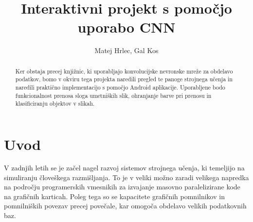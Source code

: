 \documentclass[runningheads,a4paper]{llncs}
\newcommand{\keywords}[1]{\par\addvspace\baselineskip
\noindent\keywordname\enspace\ignorespaces#1}
\begin{document}
\mainmatter  %

\title{Interaktivni projekt s pomočjo uporabo CNN}


%
%
\author{Matej Hrlec, Gal Kos}
%


%
%

\maketitle


\begin{abstract}
Ker obstaja precej knjižnic, ki uporabljajo konvolucijske nevronske mreže za obdelavo podatkov, bomo v okviru tega projekta naredili pregled te panoge strojnega učenja in naredili praktično implementacijo s pomočjo Android aplikacije. Uporabljene bodo funkcionalnost prenosa sloga umetniških slik, ohranjanje barve pri prenosu in klasificiranju objektov v slikah.
\end{abstract}


\section{Uvod}
V zadnjih letih se je začel nagel razvoj sistemov strojnega učenja, ki temeljijo na simuliranju človeškega razmišljanja. To je v veliki možno zaradi velikega napredka na področju programerskih vmesnikih za izvajanje masovno paralelizirane kode na grafičnih karticah. Poleg tega so se kapacitete grafičnih pomnilnikov in pomnilniških povezav precej povečale, kar omogoča obdelavo velikih podatkovnih baz.
\end{document}
